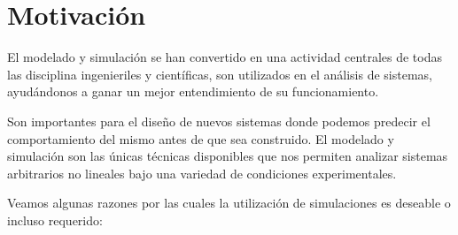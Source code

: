 \section{Motivación}
El modelado y simulación\cite{Zeigler} se han convertido en una actividad centrales de todas las disciplina ingenieriles y científicas, son utilizados en el análisis de sistemas, ayudándonos a ganar un mejor entendimiento de su funcionamiento. 

Son importantes para el diseño de nuevos sistemas donde podemos predecir el comportamiento del mismo antes de que sea construido.
El modelado y simulación son las únicas técnicas disponibles que nos permiten analizar sistemas arbitrarios no lineales bajo una variedad de condiciones experimentales.

Veamos algunas razones por las cuales la utilización de simulaciones es deseable o incluso requerido:

